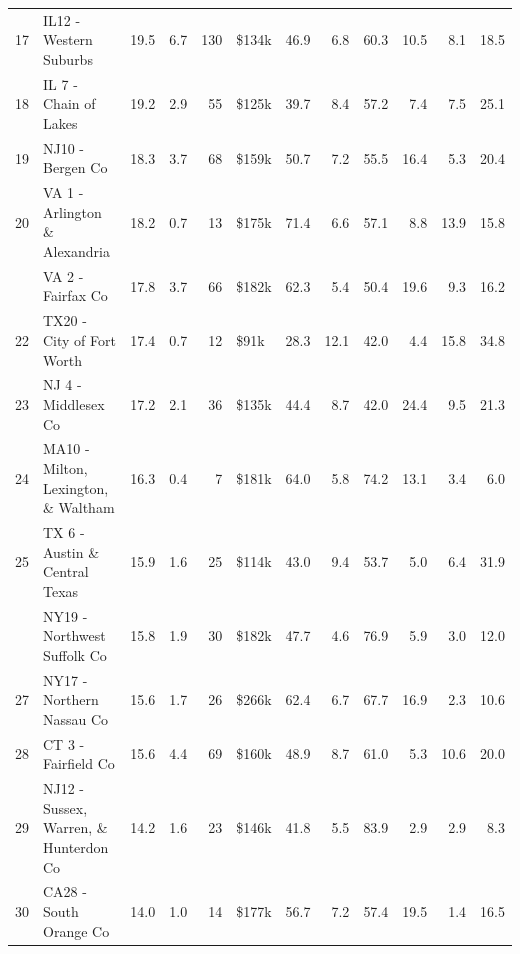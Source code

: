 \begin{table}
\begin{tabular}[t]{rlrrrlrrrrrr}
17 & IL12 - Western Suburbs & 19.5 & 6.7 & 130 & \$134k & 46.9 & 6.8 & 60.3 & 10.5 & 8.1 & 18.5\\
18 & IL 7 - Chain of Lakes & 19.2 & 2.9 & 55 & \$125k & 39.7 & 8.4 & 57.2 & 7.4 & 7.5 & 25.1\\
19 & NJ10 - Bergen Co & 18.3 & 3.7 & 68 & \$159k & 50.7 & 7.2 & 55.5 & 16.4 & 5.3 & 20.4\\
20 & VA 1 - Arlington \& Alexandria & 18.2 & 0.7 & 13 & \$175k & 71.4 & 6.6 & 57.1 & 8.8 & 13.9 & 15.8\\
\addlinespace
21 & VA 2 - Fairfax Co & 17.8 & 3.7 & 66 & \$182k & 62.3 & 5.4 & 50.4 & 19.6 & 9.3 & 16.2\\
22 & TX20 - City of Fort Worth & 17.4 & 0.7 & 12 & \$91k & 28.3 & 12.1 & 42.0 & 4.4 & 15.8 & 34.8\\
23 & NJ 4 - Middlesex Co & 17.2 & 2.1 & 36 & \$135k & 44.4 & 8.7 & 42.0 & 24.4 & 9.5 & 21.3\\
24 & MA10 - Milton, Lexington, \& Waltham & 16.3 & 0.4 & 7 & \$181k & 64.0 & 5.8 & 74.2 & 13.1 & 3.4 & 6.0\\
25 & TX 6 - Austin \& Central Texas & 15.9 & 1.6 & 25 & \$114k & 43.0 & 9.4 & 53.7 & 5.0 & 6.4 & 31.9\\
\addlinespace
26 & NY19 - Northwest Suffolk Co & 15.8 & 1.9 & 30 & \$182k & 47.7 & 4.6 & 76.9 & 5.9 & 3.0 & 12.0\\
27 & NY17 - Northern Nassau Co & 15.6 & 1.7 & 26 & \$266k & 62.4 & 6.7 & 67.7 & 16.9 & 2.3 & 10.6\\
28 & CT 3 - Fairfield Co & 15.6 & 4.4 & 69 & \$160k & 48.9 & 8.7 & 61.0 & 5.3 & 10.6 & 20.0\\
29 & NJ12 - Sussex, Warren, \& Hunterdon Co & 14.2 & 1.6 & 23 & \$146k & 41.8 & 5.5 & 83.9 & 2.9 & 2.9 & 8.3\\
30 & CA28 - South Orange Co & 14.0 & 1.0 & 14 & \$177k & 56.7 & 7.2 & 57.4 & 19.5 & 1.4 & 16.5\\
\bottomrule
\end{tabular}
\end{table}
